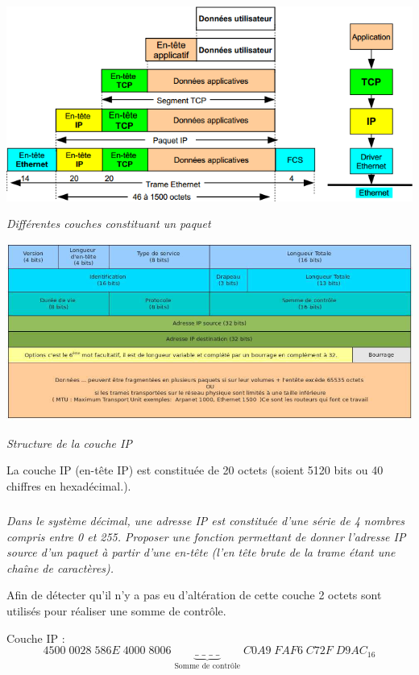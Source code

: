 \documentclass[10pt]{article}
\begin{document}
\begin{minipage}[c]{.47\linewidth}
\begin{center}
 \includegraphics[width=\textwidth]{images/CouchesTCPIP}
 
\textit{Différentes couches constituant un paquet}
\end{center}
\end{minipage} \hfill
\begin{minipage}[c]{.47\linewidth}
\begin{center}
 \includegraphics[width=\textwidth]{images/EnTeteIP}

\textit{Structure de la couche IP}
\end{center}
\end{minipage}


La couche IP (en-tête IP) est constituée de 20 octets (soient 5120 bits ou 40 chiffres en hexadécimal.).

\subparagraph{}
\textit{Dans le système décimal, une adresse IP est constituée d'une série de 4 nombres compris entre 0 et 255. Proposer une fonction permettant de donner l'adresse IP source d'un paquet à partir d'une en-tête (l'en tête brute de la trame étant une chaîne de caractères).}


 Afin de détecter qu'il n'y a pas eu d'altération de cette couche 2 octets sont utilisés pour réaliser une somme de contrôle. 
\begin{exemple}
Couche IP : 
$$4500 \; 0028 \; 586E \; 4000 \; 8006 \; \underbrace{\_ \;\_ \;\_ \;\_}_{\text{Somme de contrôle} } \; C0A9 \; FAF6 \; C72F \; D9AC _{16}$$
\end{exemple}
\end{document}
